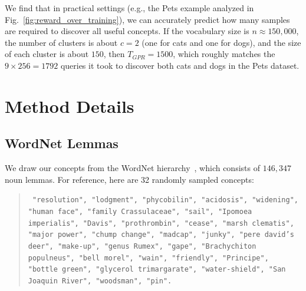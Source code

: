 We find that in practical settings (e.g., the Pets example analyzed in Fig.~\ref{fig:reward_over_training}), we can accurately predict how many samples are required to discover all useful concepts. If the vocabulary size is $n \approx 150{,}000$, the number of clusters is about $c = 2$ (one for cats and one for dogs), and the size of each cluster is about $150$, then $T_{GPR} = 1500$, which roughly matches the $9 \times 256 = 1792$ queries it took to discover both cats and dogs in the Pets dataset.


\section{Method Details}


\subsection{WordNet Lemmas}
\label{sec:wordnet_lemmas}
We draw our concepts from the WordNet hierarchy~\cite{miller1995wordnet}, which consists of $146{,}347$ noun lemmas. For reference, here are 32 randomly sampled concepts:
\begin{quote}
{\tt { 
"resolution",
"lodgment",
"phycobilin",
"acidosis",
"widening",
"human face",
"family Crassulaceae",
"sail",
"Ipomoea imperialis",
"Davis",
"prothrombin",
"cease",
"marsh clematis",
"major power",
"chump change",
"madcap",
"junky",
"pere david's deer",
"make-up",
"genus Rumex",
"gape",
"Brachychiton populneus",
"bell morel",
"wain",
"friendly",
"Principe",
"bottle green",
"glycerol trimargarate",
"water-shield",
"San Joaquin River",
"woodsman",
"pin".
}}
\end{quote}

